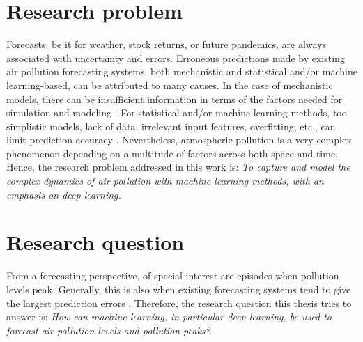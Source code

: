 
\section{Research problem}

Forecasts, be it for weather, stock returns, or future pandemics, are always associated with uncertainty and errors. Erroneous predictions made by existing air pollution forecasting systems, both mechanistic and statistical and/or machine learning-based, can be attributed to many causes. 
In the case of mechanistic models, there can be insufficient information in terms of the factors needed for simulation and modeling \cite{atmos7020015}. For statistical and/or machine learning methods, too simplistic models, lack of data, irrelevant input features, overfitting, etc., can limit prediction accuracy \cite{atmos7020015}. Nevertheless, atmospheric pollution is a very complex phenomenon depending on a multitude of factors across both space and time. Hence, the research problem addressed in this work is:
\textit{To capture and model the complex dynamics of air pollution with machine learning methods, with an emphasis on deep learning.}




\section{Research question}
\label{sec:research question}
From a forecasting perspective, of special interest are episodes when pollution levels peak. Generally, this is also when existing forecasting systems tend to give the largest prediction errors \cite{atmos7020015}. Therefore, the research question this thesis tries to answer is:
\textit{How can machine learning, in particular deep learning, be used to forecast air pollution levels and pollution peaks?}

